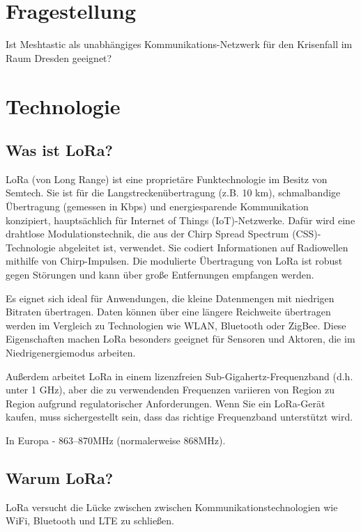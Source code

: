 \documentclass[12pt,a4paper]{article}
\begin{document}
\section{Fragestellung}

Ist Meshtastic als unabhängiges Kommunikations-Netzwerk für den Krisenfall im Raum Dresden geeignet?

\section{Technologie}
\subsection{Was ist LoRa?}

LoRa (von Long Range) ist eine proprietäre Funktechnologie im Besitz von Semtech. Sie ist für die Langstreckenübertragung (z.B. 10 km),
schmalbandige Übertragung (gemessen in Kbps) und energiesparende Kommunikation konzipiert, hauptsächlich für Internet of Things (IoT)-Netzwerke.
Dafür wird eine drahtlose Modulationstechnik, die aus der Chirp Spread Spectrum (CSS)-Technologie abgeleitet ist, verwendet.
Sie codiert Informationen auf Radiowellen mithilfe von Chirp-Impulsen. Die modulierte Übertragung von LoRa ist robust gegen Störungen
und kann über große Entfernungen empfangen werden.

Es eignet sich ideal für Anwendungen, die kleine Datenmengen mit niedrigen Bitraten übertragen. Daten können über eine längere Reichweite
übertragen werden im Vergleich zu Technologien wie WLAN, Bluetooth oder ZigBee. Diese Eigenschaften machen LoRa besonders geeignet für
Sensoren und Aktoren, die im Niedrigenergiemodus arbeiten.

Außerdem arbeitet LoRa in einem lizenzfreien Sub-Gigahertz-Frequenzband (d.h. unter 1 GHz), aber die zu verwendenden Frequenzen variieren
von Region zu Region aufgrund regulatorischer Anforderungen. Wenn Sie ein LoRa-Gerät kaufen, muss sichergestellt sein, dass das richtige
Frequenzband unterstützt wird.

In Europa - 863–870MHz (normalerweise 868MHz).
\newpage
\subsection{Warum LoRa?}

LoRa versucht die Lücke zwischen zwischen Kommunikationstechnologien wie WiFi, Bluetooth und LTE zu schließen.\\
\end{document}
